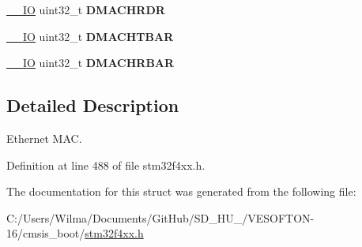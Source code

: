 \begin{DoxyCompactItemize}
\item 
\mbox{\label{struct_e_t_h___type_def_a9c49de2e699886d6604fd2b3d376a0e9}} 
\hyperlink{group___c_m_s_i_s__core__definitions_gaec43007d9998a0a0e01faede4133d6be}{\+\_\+\+\_\+\+IO} uint32\+\_\+t {\bfseries D\+M\+A\+C\+H\+R\+DR}
\item 
\mbox{\label{struct_e_t_h___type_def_a900f9f888342fbdd8ee07e3ee1d4b73c}} 
\hyperlink{group___c_m_s_i_s__core__definitions_gaec43007d9998a0a0e01faede4133d6be}{\+\_\+\+\_\+\+IO} uint32\+\_\+t {\bfseries D\+M\+A\+C\+H\+T\+B\+AR}
\item 
\mbox{\label{struct_e_t_h___type_def_acf3f7ecbf774d8d505655ac7f24761fc}} 
\hyperlink{group___c_m_s_i_s__core__definitions_gaec43007d9998a0a0e01faede4133d6be}{\+\_\+\+\_\+\+IO} uint32\+\_\+t {\bfseries D\+M\+A\+C\+H\+R\+B\+AR}
\end{DoxyCompactItemize}


\subsection{Detailed Description}
Ethernet M\+AC. 

Definition at line 488 of file stm32f4xx.\+h.



The documentation for this struct was generated from the following file\+:\begin{DoxyCompactItemize}
\item 
C\+:/\+Users/\+Wilma/\+Documents/\+Git\+Hub/\+S\+D\+\_\+\+H\+U\+\_/\+V\+E\+S\+O\+F\+T\+O\+N-\/16/cmsis\+\_\+boot/\hyperlink{stm32f4xx_8h}{stm32f4xx.\+h}\end{DoxyCompactItemize}
